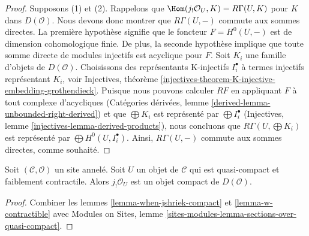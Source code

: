 \begin{proof}
Supposons (1) et (2). Rappelons que
$\Hom(j_!\mathcal{O}_U, K) = R\Gamma(U, K)$ pour $K$ dans $D(\mathcal{O})$.
Nous devons donc montrer que $R\Gamma(U, -)$ commute aux sommes directes. La
première hypothèse signifie que le foncteur $F = H^0(U, -)$ est de dimension
cohomologique finie. De plus, la seconde hypothèse implique que toute somme
directe de modules injectifs est acyclique pour $F$. Soit $K_i$ une famille
d'objets de $D(\mathcal{O})$. Choisissons des représentants K-injectifs
$I_i^\bullet$ à termes injectifs représentant $K_i$, voir Injectives,
théorème \ref{injectives-theorem-K-injective-embedding-grothendieck}. Puisque
nous pouvons calculer $RF$ en appliquant $F$ à tout complexe d'acycliques
(Catégories dérivées, lemme \ref{derived-lemma-unbounded-right-derived}) et
que $\bigoplus K_i$ est représenté par $\bigoplus I_i^\bullet$ (Injectives,
lemme \ref{injectives-lemma-derived-products}), nous concluons que
$R\Gamma(U, \bigoplus K_i)$ est représenté par
$\bigoplus H^0(U, I_i^\bullet)$. Ainsi, $R\Gamma(U, -)$ commute aux sommes
directes, comme souhaité.
\end{proof}

\begin{lemma}
\label{lemma-quasi-compact-weakly-contractible-compact}
Soit $(\mathcal{C}, \mathcal{O})$ un site annelé. Soit $U$ un objet de
$\mathcal{C}$ qui est quasi-compact et faiblement contractile. Alors
$j_!\mathcal{O}_U$ est un objet compact de $D(\mathcal{O})$.
\end{lemma}

\begin{proof}
Combiner les lemmes \ref{lemma-when-jshriek-compact} et
\ref{lemma-w-contractible} avec Modules on Sites, lemme
\ref{sites-modules-lemma-sections-over-quasi-compact}.
\end{proof}

